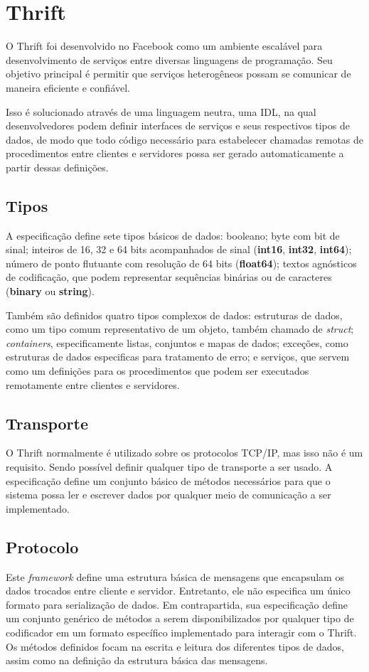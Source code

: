 \section{Thrift}

O Thrift \cite{slee_thrift_nodate} foi desenvolvido no Facebook como um ambiente escalável para desenvolvimento de serviços entre diversas linguagens de programação. Seu objetivo principal é permitir que serviços heterogêneos possam se comunicar de maneira eficiente e confiável.

Isso é solucionado através de uma linguagem neutra, uma IDL, na qual desenvolvedores podem definir interfaces de serviços e seus respectivos tipos de dados, de modo que todo código necessário para estabelecer chamadas remotas de procedimentos entre clientes e servidores possa ser gerado automaticamente a partir dessas definições.

\subsection{Tipos}
A especificação define sete tipos básicos de dados: booleano; byte com bit de sinal; inteiros de 16, 32 e 64 bits acompanhados de sinal  (\textbf{int16}, \textbf{int32}, \textbf{int64}); número de ponto flutuante com resolução de 64 bits (\textbf{float64}); textos agnósticos de codificação, que podem representar sequências binárias ou de caracteres (\textbf{binary} ou \textbf{string}).

Também são definidos quatro tipos complexos de dados: estruturas de dados, como um tipo comum representativo de um objeto, também chamado de \textit{struct}; \textit{containers}, especificamente listas, conjuntos e mapas de dados; exceções, como estruturas de dados especificas para tratamento de erro; e serviços, que servem como um definições para os procedimentos que podem ser executados remotamente entre clientes e servidores.

\subsection{Transporte}
O Thrift normalmente é utilizado sobre os protocolos TCP/IP, mas isso não é um requisito. Sendo possível definir qualquer tipo de transporte a ser usado. A especificação define um conjunto básico de métodos necessários para que o sistema possa ler e escrever dados por qualquer meio de comunicação a ser implementado.

\subsection{Protocolo}
Este \textit{framework} define uma estrutura básica de mensagens que encapsulam os dados trocados entre cliente e servidor. Entretanto, ele não especifica um único formato para serialização de dados. Em contrapartida, sua especificação define um conjunto genérico de métodos a serem disponibilizados por qualquer tipo de codificador em um formato específico implementado para interagir com o Thrift. Os métodos definidos focam na escrita e leitura dos diferentes tipos de dados, assim como na definição da estrutura básica das mensagens.

